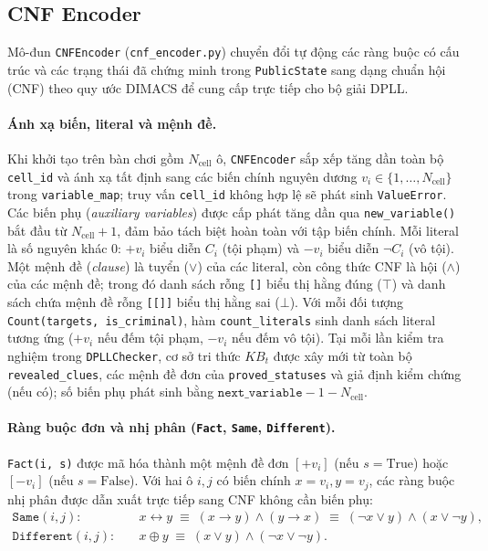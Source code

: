 \subsection{CNF Encoder}
\label{subsec:cnf_encoder}

Mô-đun \texttt{CNFEncoder} (\texttt{cnf\_encoder.py}) chuyển đổi tự động các ràng buộc có cấu trúc và các trạng thái đã chứng minh trong \texttt{PublicState} sang dạng chuẩn hội (CNF) theo quy ước DIMACS để cung cấp trực tiếp cho bộ giải DPLL.

\paragraph{Ánh xạ biến, literal và mệnh đề.}
Khi khởi tạo trên bàn chơi gồm $N_{\text{cell}}$ ô, \texttt{CNFEncoder} sắp xếp tăng dần toàn bộ \texttt{cell\_id} và ánh xạ tất định sang các biến chính nguyên dương $v_i \in \{1, \dots, N_{\text{cell}}\}$ trong \texttt{variable\_map}; truy vấn \texttt{cell\_id} không hợp lệ sẽ phát sinh \texttt{ValueError}. Các biến phụ (\textit{auxiliary variables}) được cấp phát tăng dần qua \texttt{new\_variable()} bắt đầu từ $N_{\text{cell}} + 1$, đảm bảo tách biệt hoàn toàn với tập biến chính. Mỗi literal là số nguyên khác $0$: $+v_i$ biểu diễn $C_i$ (tội phạm) và $-v_i$ biểu diễn $\neg C_i$ (vô tội). Một mệnh đề (\textit{clause}) là tuyển ($\lor$) của các literal, còn công thức CNF là hội ($\land$) của các mệnh đề; trong đó danh sách rỗng \texttt{[]} biểu thị hằng đúng ($\top$) và danh sách chứa mệnh đề rỗng \texttt{[[]]} biểu thị hằng sai ($\bot$). Với mỗi đối tượng \texttt{Count(targets, is\_criminal)}, hàm \texttt{count\_literals} sinh danh sách literal tương ứng ($+v_i$ nếu đếm tội phạm, $-v_i$ nếu đếm vô tội). Tại mỗi lần kiểm tra nghiệm trong \texttt{DPLLChecker}, cơ sở tri thức $KB_t$ được xây mới từ toàn bộ \texttt{revealed\_clues}, các mệnh đề đơn của \texttt{proved\_statuses} và giả định kiểm chứng (nếu có); số biến phụ phát sinh bằng $\texttt{next\_variable} - 1 - N_{\text{cell}}$.

\paragraph{Ràng buộc đơn và nhị phân (\texttt{Fact}, \texttt{Same}, \texttt{Different}).}
\texttt{Fact(i, s)} được mã hóa thành một mệnh đề đơn $[+v_i]$ (nếu $s = \text{True}$) hoặc $[-v_i]$ (nếu $s = \text{False}$). Với hai ô $i, j$ có biến chính $x = v_i, y = v_j$, các ràng buộc nhị phân được dẫn xuất trực tiếp sang CNF không cần biến phụ:
\begin{align*}
    \texttt{Same}(i, j):\quad & x \leftrightarrow y \;\equiv\; (x \rightarrow y) \land (y \rightarrow x) \;\equiv\; (\neg x \lor y) \land (x \lor \neg y), \\
    \texttt{Different}(i, j):\quad & x \oplus y \;\equiv\; (x \lor y) \land (\neg x \lor \neg y).
\end{align*}

